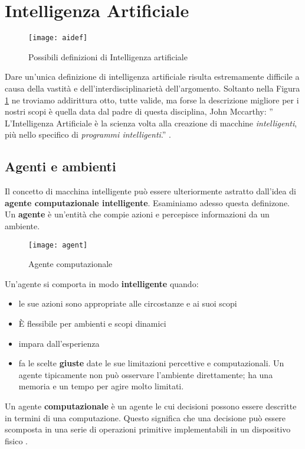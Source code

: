 \section{Intelligenza Artificiale}

\begin{figure}
    \texttt{[image: aidef]}
    \caption{Possibili definizioni di Intelligenza artificiale\cite{aima}}
    \label{fig:ai}
  \end{figure}
Dare un'unica definizione di intelligenza artificiale risulta estremamente difficile a causa della vastità
e dell'interdisciplinarietà dell'argomento. Soltanto nella Figura \ref{fig:ai} ne troviamo addirittura otto, tutte valide, ma forse
la descrizione  migliore per i nostri scopi  è quella data dal padre di questa disciplina, John Mccarthy:
'' L'Intelligenza Artificiale è la scienza volta alla creazione di macchine  \emph{intelligenti},
più nello specifico di \emph{programmi intelligenti}.'' \cite{ai}.
\subsection{Agenti e ambienti}
Il concetto di macchina intelligente può essere ulteriormente
astratto dall'idea di \textbf{agente computazionale intelligente}. Esaminiamo adesso questa definizone.
Un \textbf{agente} è un'entità che compie azioni
e percepisce informazioni da un ambiente.

\begin{figure}
  \centering
  \texttt{[image: agent]}
  \caption{Agente computazionale\cite{aima}}
  \label{fig:agente}
\end{figure}

Un'agente si comporta in modo \textbf{intelligente} quando:
\begin{itemize}
  \item le sue azioni sono appropriate alle circostanze e ai suoi scopi
  \item È flessibile per ambienti e scopi dinamici
  \item impara dall'esperienza
  \item fa le scelte \textbf{giuste} date le sue limitazioni percettive e computazionali. Un agente tipicamente
  non può osservare l'ambiente direttamente; ha una memoria e un tempo per agire molto limitati.
\end{itemize}
 Un agente \textbf{computazionale} è un agente le cui decisioni possono essere descritte in termini di una
 computazione. Questo significa che una decisione può essere scomposta in una serie di operazioni primitive
 implementabili in un dispositivo fisico \cite{PooleMackworth17}.
